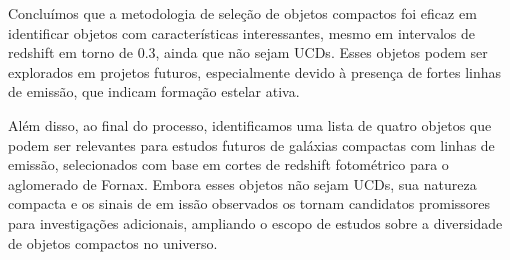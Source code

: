 Concluímos que a metodologia de seleção de objetos compactos foi eficaz em identificar objetos com características interessantes, mesmo em intervalos de redshift em torno de 0.3, ainda que não sejam UCDs. Esses objetos podem ser explorados em projetos futuros, especialmente devido à presença de fortes linhas de emissão, que indicam formação estelar ativa.

Além disso, ao final do processo, identificamos uma lista de quatro objetos que podem ser relevantes para estudos futuros de galáxias compactas com linhas de emissão, selecionados com base em cortes de redshift fotométrico para o aglomerado de Fornax. Embora esses objetos não sejam UCDs, sua natureza compacta e os sinais de em    issão observados os tornam candidatos promissores para investigações adicionais, ampliando o escopo de estudos sobre a diversidade de objetos compactos no universo.

